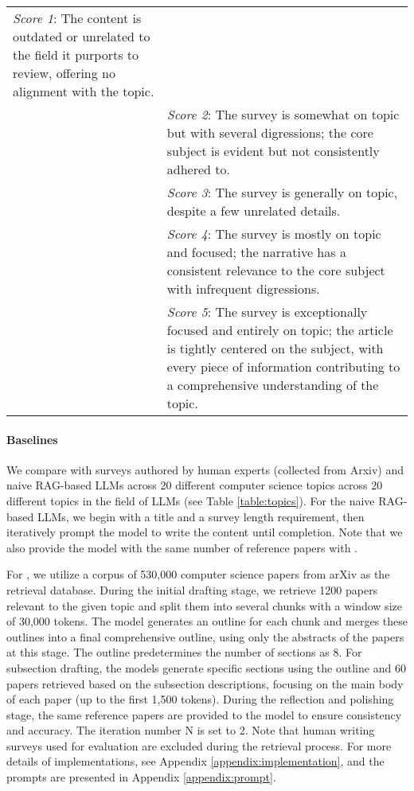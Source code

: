 \begin{table}[ht!]
\begin{tabular}{p{1cm} p{12cm}}
\textit{Score 1}: The content is outdated or unrelated to the field it purports to review, offering no alignment with the topic. \\
                   & \textit{Score 2}: The survey is somewhat on topic but with several digressions; the core subject is evident but not consistently adhered to. \\
                   & \textit{Score 3}: The survey is generally on topic, despite a few unrelated details. \\
                   & \textit{Score 4}: The survey is mostly on topic and focused; the narrative has a consistent relevance to the core subject with infrequent digressions. \\
                   & \textit{Score 5}: The survey is exceptionally focused and entirely on topic; the article is tightly centered on the subject, with every piece of information contributing to a comprehensive understanding of the topic. \\
\bottomrule
\end{tabular}
\end{table}

\paragraph{Baselines} We compare \ourmethod with surveys authored by human experts (collected from Arxiv) and naive RAG-based LLMs across 20 different computer science topics across 20 different topics in the field of LLMs (see Table \ref{table:topics}). For the naive RAG-based LLMs, we begin with a title and a survey length requirement, then iteratively prompt the model to write the content until completion. Note that we also provide the model with the same number of reference papers with \ourmethod.

For \ourmethod, we utilize a corpus of 530,000 computer science papers from arXiv as the retrieval database. During the initial drafting stage, we retrieve 1200 papers relevant to the given topic and split them into several chunks with a window size of 30,000 tokens. The model generates an outline for each chunk and merges these outlines into a final comprehensive outline, using only the abstracts of the papers at this stage. The outline predetermines the number of sections as 8. For subsection drafting, the models generate specific sections using the outline and 60 papers retrieved based on the subsection descriptions, focusing on the main body of each paper (up to the first 1,500 tokens). During the reflection and polishing stage, the same reference papers are provided to the model to ensure consistency and accuracy. The iteration number N is set to 2. Note that human writing surveys used for evaluation are excluded during the retrieval process. For more details of implementations, see Appendix \ref{appendix:implementation}, and the prompts are presented in Appendix \ref{appendix:prompt}.

